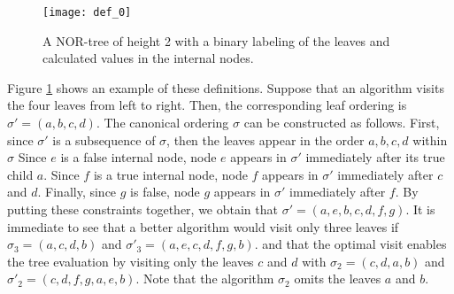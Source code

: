 \begin{figure}[H]
	\centering
	\texttt{[image: def\_0]}
	\caption{A NOR-tree of height 2 with a binary labeling of the leaves
		and calculated values in the internal nodes.}
	\label{fig:def0}
\end{figure}
Figure \ref{fig:def0} shows an example of these definitions.
Suppose that an algorithm visits the four leaves from left to right.
Then, the corresponding leaf ordering is $\sigma' = (a, b, c, d)$.
The canonical ordering $\sigma$ can be constructed as follows.
First, since $\sigma'$ is a subsequence of $\sigma$, then
the leaves appear in the order $a, b, c, d$ within $\sigma$
Since $e$ is a false internal node, node $e$ appears in $\sigma'$
immediately after its true child $a$. 
Since $f$ is a true internal node, node $f$ appears in $\sigma'$ immediately
after $c$ and $d$. 
Finally, since $g$ is false, node $g$ appears in $\sigma'$ immediately
after $f$.
By putting these constraints together, we obtain that 
$\sigma' = (a, e, b, c, d, f, g)$.
It is immediate to see that a better algorithm would visit only three leaves
if $\sigma_3 = (a, c, d, b)$ and $\sigma'_3 = (a, e, c, d, f, g, b)$.
and that the optimal visit enables the tree evaluation by visiting
only the leaves $c$ and $d$ with 
$\sigma_2 = (c, d, a, b)$ and $\sigma'_2 = (c, d, f, g, a, e, b)$.
Note that the algorithm $\sigma_2$ omits the leaves $a$ and $b$.


%


